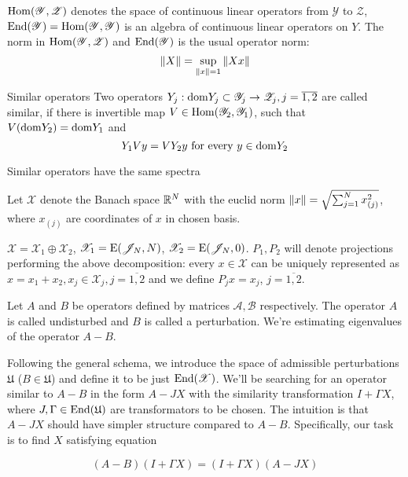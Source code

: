 \documentclass{article}
\begin{document}
\( \mathrm{Hom}({\mathscr Y},{\mathscr Z}) \) denotes the space of continuous linear operators
from \( \mathscr Y \) to \( \mathscr Z \),
\( \mathrm{End}({\mathscr Y}) = \mathrm{Hom}({\mathscr Y},{\mathscr Y}) \) is an algebra of continuous linear operators on \( Y \).
The norm in \( \mathrm{Hom}({\mathscr Y},{\mathscr Z}) \) and \( \mathrm{End}({\mathscr Y}) \) is the usual operator norm:
\[\left\|{X}\right\| = \sup_{\left\|{x}\right\| = 1}{\left\|{X x}\right\|}\]
\begin{dfn}{Similar operators}
    Two operators \( Y_j:\mathrm{dom} {Y_j}\subset\mathscr Y_j\to\mathscr Z_j, j=\overline{1,2} \) are called similar,
    if there is invertible map \( V\in\mathrm{Hom}({\mathscr Y_2},{\mathscr Y_1}) \),
    such that \( V(\mathrm{dom} {Y_2}) = \mathrm{dom} {Y_1} \) and
    \[Y_1 V y = V Y_2 y \text{ for every } y\in\mathrm{dom} {Y_2}\]
\end{dfn}
\begin{propose}
    Similar operators have the same spectra
\end{propose}

Let \( \mathscr X \) denote the Banach space \( \mathbb{R}^N \) with the euclid norm
\( \left\|{x}\right\| = \sqrt{\sum_{j=1}^N x_{(j)}^2} \), where \( x_{(j)} \) are coordinates of \( x \) in chosen basis.

\( \mathscr X = \mathscr X_1 \oplus \mathscr X_2 \),
\( \mathscr X_1 = \mathrm{E}({\mathscr{J}_{N}}, {N}) \),
\( \mathscr X_2 = \mathrm{E}({\mathscr{J}_{N}}, {0}) \).
\( P_1, P_2 \) will denote projections performing the above decomposition:
every \( x\in\mathscr X \) can be uniquely represented as \( x = x_1 + x_2, x_j\in\mathscr X_j,j=\overline{1,2} \)
and we define \( P_j x = x_j \), \( j=\overline{1,2} \).

Let \( A \) and \( B \) be operators defined by matrices \( \mathcal A, \mathcal B \) respectively.
The operator \( A \) is called undisturbed and \( B \) is called a perturbation.
We're estimating eigenvalues of the operator \( A - B \).

Following the general schema, we introduce
the space of admissible perturbations \( \mathfrak U \) (\( B\in\mathfrak U \))
and define it to be just \( \mathrm{End}({\mathscr X}) \).
We'll be searching for an operator similar to \( A - B \)
in the form \( A - JX \) with the similarity transformation \( I + \Gamma X \),
where \( J, \Gamma \in \mathrm{End}({\mathfrak U}) \) are transformators to be chosen.
The intuition is that \( A - JX \) should have simpler structure compared to \( A-B \).
Specifically, our task is to find \( X \) satisfying equation

\[(A - B)(I + \Gamma X) = (I + \Gamma X)(A - JX)\]
\end{document}
